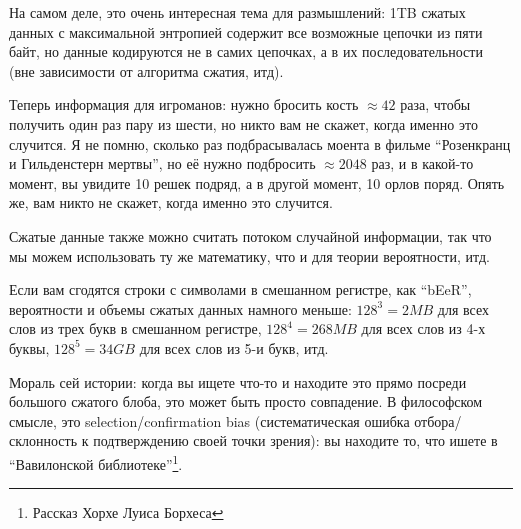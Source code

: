 На самом деле, это очень интересная тема для размышлений: 1TB сжатых данных с максимальной энтропией содержит все возможные цепочки из пяти байт,
но данные кодируются не в самих цепочках, а в их последовательности (вне зависимости от алгоритма сжатия, итд).

Теперь информация для игроманов: нужно бросить кость $\approx 42$ раза, чтобы получить один раз пару из шести, но никто вам не скажет, когда именно это случится.
Я не помню, сколько раз подбрасывалась моента в фильме ``Розенкранц и Гильденстерн мертвы'', но её нужно подбросить $\approx 2048$ раз, и в какой-то момент, вы увидите 10 решек подряд, а в другой момент,
10 орлов поряд.
Опять же, вам никто не скажет, когда именно это случится.

Сжатые данные также можно считать потоком случайной информации, так что мы можем использовать ту же математику, что и для теории вероятности, итд.

Если вам сгодятся строки с символами в смешанном регистре, как ``bEeR'', вероятности и объемы сжатых данных намного меньше:
$128^3=2MB$ для всех слов из трех букв в смешанном регистре,
$128^4=268MB$ для всех слов из 4-х буквы,
$128^5=34GB$ для всех слов из 5-и букв, итд.

Мораль сей истории: когда вы ищете что-то и находите это прямо посреди большого сжатого блоба, это может быть просто совпадение.
В философском смысле, это selection/confirmation bias (систематическая ошибка отбора/склонность к подтверждению своей точки зрения):
вы находите то, что ишете в ``Вавилонской библиотеке''\footnote{Рассказ Хорхе Луиса Борхеса}.

